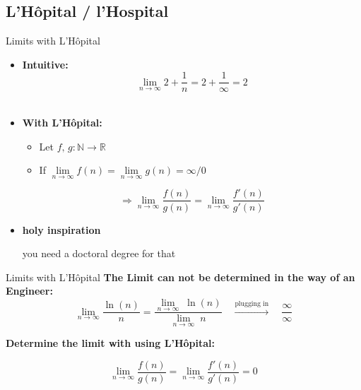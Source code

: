 \subsection{L'H\^{o}pital / l'Hospital}

\begin{frame}{Limits with L'H\^{o}pital}
  \begin{itemize}
  \item \textbf{Intuitive:}\\
  \begin{displaymath}
    \lim\limits_{n \rightarrow \infty} 2 + \dfrac{1}{n} = 2  +
    \dfrac{1}{\infty} = 2
  \end{displaymath}
  \vspace{0.0em}\\
\item<2->   \textbf{With L'H\^{o}pital:}
  \begin{itemize}
    \item
      Let $f, \, g : \mathbb{N} \rightarrow \mathbb{R}$
    \item
      If
      \begin{math}
        \lim\limits_{n \to \infty} f(n)
          = \lim\limits_{n \to \infty} g(n)
          = \infty / 0
      \end{math}
  \end{itemize}
  \begin{displaymath}
    \Rightarrow \lim\limits_{n \rightarrow \infty} \dfrac{f(n)}{g(n)}
      = \lim\limits_{n \rightarrow \infty} \dfrac{f'(n)}{g'(n)}
  \end{displaymath}
  \item<3->\textbf{holy inspiration}
    \begin{center}
      you need a doctoral degree for that
    \end{center}
  \end{itemize}
\end{frame}


\begin{frame}{Limits with L'H\^{o}pital}
  \textbf{The Limit can not be determined in the way of an Engineer:}
  \begin{displaymath}
    \lim_{n \to \infty} \dfrac{\ln (n)}{n}
      = \dfrac{\lim_{n \to \infty}\; \ln (n)}{\lim\limits_{n \to \infty}\; n}
    \hspace{1em} \stackrel{\text{plugging in}}{\longrightarrow} \hspace{1em}
      \dfrac{\infty}{\infty}
  \end{displaymath}
  
  \textbf{Determine the limit with using L'H\^{o}pital:}
  
  \begin{displaymath}
      \lim\limits_{n \rightarrow \infty} \dfrac{f(n)}{g(n)}
        = \lim\limits_{n \rightarrow \infty} \dfrac{f'(n)}{g'(n)} = 0
    \end{displaymath}
  
\end{frame}

